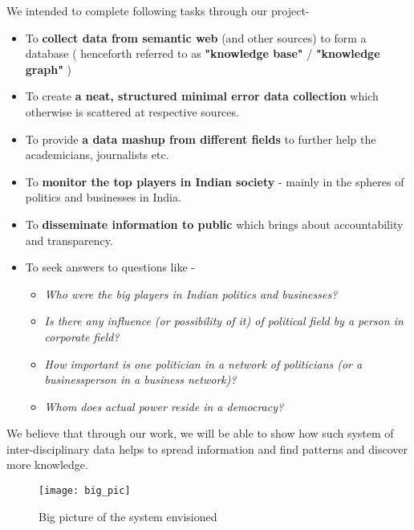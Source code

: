 We intended to complete following tasks through our project-
\begin{itemize}

    \item To \textbf{collect data from semantic web} (and other sources) to form a database ( henceforth referred to as \textbf{"knowledge base"} / \textbf{"knowledge graph"} )
    \item To create \textbf{ a neat, structured minimal error data collection } which otherwise is scattered at respective sources.
    \item To provide \textbf{ a data mashup from different fields } to further help the academicians, journalists etc.
    \item To \textbf{ monitor the top players in Indian society } - mainly in the spheres of politics and businesses in India.
    \item To \textbf{ disseminate information to public }  which brings about accountability and transparency. 
    \item  To seek answers to questions like -
        \begin{itemize}
         \item \emph{ Who were the big players in Indian politics and businesses? }
         \item \emph{ Is there any influence (or possibility of it) of political field by a person in corporate field? }
         \item \emph{ How important is one politician in a network of politicians (or a businessperson in a business network)? }
         \item \emph{ Whom does actual power reside in a democracy? }
        \end{itemize}
\end{itemize}
We believe that through our work, we will be able to show how such system of inter-disciplinary data helps to spread information and find patterns and discover more knowledge.

\begin{figure}[H]
\begin{center}  
\texttt{[image: big\_pic]} 
\caption{Big picture of the system envisioned}
\label{fig:big_pic}
\end{center}
\end{figure}

